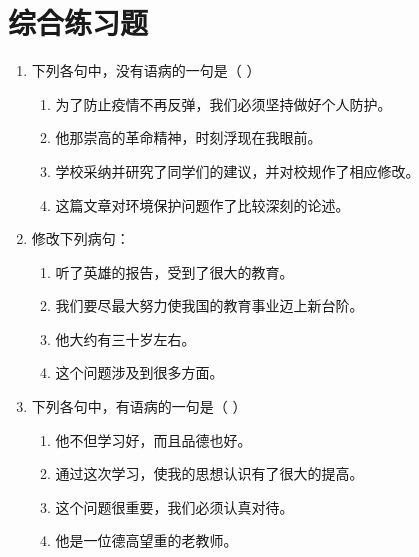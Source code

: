 \documentclass[a4paper,12pt]{ctexrep}
\begin{document}
\section{综合练习题}
\begin{enumerate}
    \item 下列各句中，没有语病的一句是（ ）
    \begin{enumerate}[label=\Alph*.]
        \item 为了防止疫情不再反弹，我们必须坚持做好个人防护。
        \item 他那崇高的革命精神，时刻浮现在我眼前。
        \item 学校采纳并研究了同学们的建议，并对校规作了相应修改。
        \item 这篇文章对环境保护问题作了比较深刻的论述。
    \end{enumerate}
    \item 修改下列病句：
    \begin{enumerate}
        \item 听了英雄的报告，受到了很大的教育。
        \item 我们要尽最大努力使我国的教育事业迈上新台阶。
        \item 他大约有三十岁左右。
        \item 这个问题涉及到很多方面。
    \end{enumerate}
    \item 下列各句中，有语病的一句是（ ）
    \begin{enumerate}[label=\Alph*.]
        \item 他不但学习好，而且品德也好。
        \item 通过这次学习，使我的思想认识有了很大的提高。
        \item 这个问题很重要，我们必须认真对待。
        \item 他是一位德高望重的老教师。
    \end{enumerate}
\end{enumerate}
\end{document}
